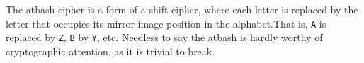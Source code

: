 

The atbash cipher is a form of a shift cipher, where each letter is
replaced by the letter that occupies its mirror image position in the
alphabet.\indAtbash That is, {\tt A} is replaced by {\tt Z}, {\tt B}
by {\tt Y}, etc. Needless to say the atbash is hardly worthy of
cryptographic attention, as it is trivial to break.

